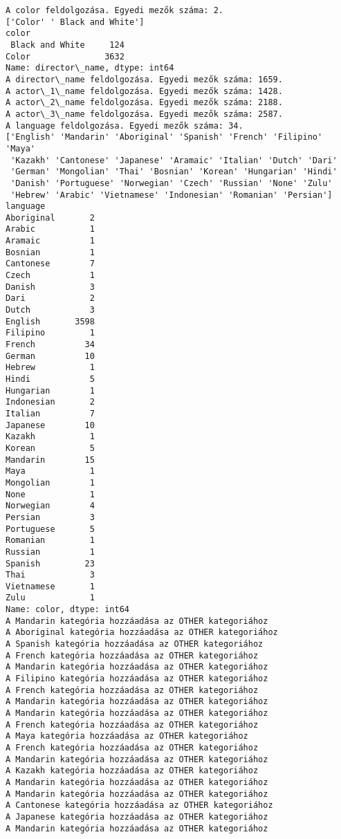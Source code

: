 \documentclass[11pt]{article}
\begin{document}
    \begin{Verbatim}[commandchars=\\\{\}]
A color feldolgozása. Egyedi mezők száma: 2.
['Color' ' Black and White']
color
 Black and White     124
Color               3632
Name: director\_name, dtype: int64
A director\_name feldolgozása. Egyedi mezők száma: 1659.
A actor\_1\_name feldolgozása. Egyedi mezők száma: 1428.
A actor\_2\_name feldolgozása. Egyedi mezők száma: 2188.
A actor\_3\_name feldolgozása. Egyedi mezők száma: 2587.
A language feldolgozása. Egyedi mezők száma: 34.
['English' 'Mandarin' 'Aboriginal' 'Spanish' 'French' 'Filipino' 'Maya'
 'Kazakh' 'Cantonese' 'Japanese' 'Aramaic' 'Italian' 'Dutch' 'Dari'
 'German' 'Mongolian' 'Thai' 'Bosnian' 'Korean' 'Hungarian' 'Hindi'
 'Danish' 'Portuguese' 'Norwegian' 'Czech' 'Russian' 'None' 'Zulu'
 'Hebrew' 'Arabic' 'Vietnamese' 'Indonesian' 'Romanian' 'Persian']
language
Aboriginal       2
Arabic           1
Aramaic          1
Bosnian          1
Cantonese        7
Czech            1
Danish           3
Dari             2
Dutch            3
English       3598
Filipino         1
French          34
German          10
Hebrew           1
Hindi            5
Hungarian        1
Indonesian       2
Italian          7
Japanese        10
Kazakh           1
Korean           5
Mandarin        15
Maya             1
Mongolian        1
None             1
Norwegian        4
Persian          3
Portuguese       5
Romanian         1
Russian          1
Spanish         23
Thai             3
Vietnamese       1
Zulu             1
Name: color, dtype: int64
A Mandarin kategória hozzáadása az OTHER kategoriához
A Aboriginal kategória hozzáadása az OTHER kategoriához
A Spanish kategória hozzáadása az OTHER kategoriához
A French kategória hozzáadása az OTHER kategoriához
A Mandarin kategória hozzáadása az OTHER kategoriához
A Filipino kategória hozzáadása az OTHER kategoriához
A French kategória hozzáadása az OTHER kategoriához
A Mandarin kategória hozzáadása az OTHER kategoriához
A Mandarin kategória hozzáadása az OTHER kategoriához
A French kategória hozzáadása az OTHER kategoriához
A Maya kategória hozzáadása az OTHER kategoriához
A French kategória hozzáadása az OTHER kategoriához
A Mandarin kategória hozzáadása az OTHER kategoriához
A Kazakh kategória hozzáadása az OTHER kategoriához
A Mandarin kategória hozzáadása az OTHER kategoriához
A Mandarin kategória hozzáadása az OTHER kategoriához
A Cantonese kategória hozzáadása az OTHER kategoriához
A Japanese kategória hozzáadása az OTHER kategoriához
A Mandarin kategória hozzáadása az OTHER kategoriához

\end{Verbatim}
\end{document}
